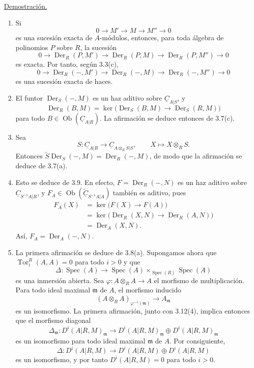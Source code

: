 \underline{Demostración.}

\begin{enumerate}[label=(\arabic*)]
\item Si
\[
 0\longrightarrow M'\longrightarrow M\longrightarrow M''
 \longrightarrow0
\]
es una sucesión exacta de $A$-módulos, entonces, para toda álgebra de
polinomios $P$ sobre $R$, la sucesión
\[
 0\longrightarrow\operatorname{Der}_R(P,M')
 \longrightarrow\operatorname{Der}_R(P,M)
 \longrightarrow\operatorname{Der}_R(P,M'')
 \longrightarrow0
\]
es exacta. Por tanto, según 3.3(c),
\[
 0\longrightarrow\operatorname{Der}_R(-,M')
 \longrightarrow\operatorname{Der}_R(-,M)
 \longrightarrow\operatorname{Der}_R(-,M'')
 \longrightarrow0
\]
es una sucesión exacta de haces.

\item El funtor $\operatorname{Der}_S(-,M)$ es un haz aditivo sobre
$\underline C_{A|S}$, y
\[
 \operatorname{Der}_R(B,M)
 =\ker\bigl(\operatorname{Der}_S(B,M)
 \longrightarrow\operatorname{Der}_S(R,M)\bigr)
\]
para todo $B\in\operatorname{Ob}(\underline C_{A|R})$.
La afirmación se deduce entonces de 3.7(c).

\item Sea
\[
 S:\underline C_{A|R}\longrightarrow
 \underline C_{A\otimes_RS|S},
 \qquad X\longmapsto X\otimes_RS.
\]
Entonces
$\widetilde S\operatorname{Der}_S(-,M)
=\operatorname{Der}_R(-,M)$, de modo que la afirmación se deduce de
3.7(a).


\item Esto se deduce de 3.9. En efecto,
$F=\operatorname{Der}_R(-,N)$ es un haz aditivo sobre
$\underline C_{S^{-1}A|R}$, y
$F_A\in\operatorname{Ob}
(\widetilde{\underline C}_{S^{-1}A|A})$ también es aditivo, pues
\begin{align*}
 F_A(X)
 &=\ker\bigl(F(X)\longrightarrow F(A)\bigr)\\
 &=\ker\bigl(\operatorname{Der}_R(X,N)
   \longrightarrow\operatorname{Der}_R(A,N)\bigr)\\
 &=\operatorname{Der}_A(X,N).
\end{align*}
Así, $F_A=\operatorname{Der}_A(-,N)$.

\item La primera afirmación se deduce de 3.8(a). Supongamos ahora que
$\operatorname{Tor}_i^R(A,A)=0$ para todo $i>0$ y que
\[
 \Delta:\operatorname{Spec}(A)\longrightarrow
 \operatorname{Spec}(A)\times_{\operatorname{Spec}(R)}
 \operatorname{Spec}(A)
\]
es una inmersión abierta. Sea
$\varphi:A\otimes_RA\longrightarrow A$ el morfismo de multiplicación.
Para todo ideal maximal $\mathfrak m$ de $A$, el morfismo inducido
\[
 (A\otimes_RA)_{\varphi^{-1}(\mathfrak m)}
 \longrightarrow A_{\mathfrak m}
\]
es un isomorfismo. La primera afirmación, junto con 3.12(4), implica
entonces que el morfismo diagonal
\[
 \Delta_{\mathfrak m}:D^i(A|R,M)_{\mathfrak m}
 \longrightarrow D^i(A|R,M)_{\mathfrak m}
 \oplus D^i(A|R,M)_{\mathfrak m}
\]
es un isomorfismo para todo ideal maximal $\mathfrak m$ de $A$.
Por consiguiente,
\[
 \Delta:D^i(A|R,M)\longrightarrow
 D^i(A|R,M)\oplus D^i(A|R,M)
\]
es un isomorfismo, y por tanto $D^i(A|R,M)=0$ para todo $i>0$.


\end{enumerate}

